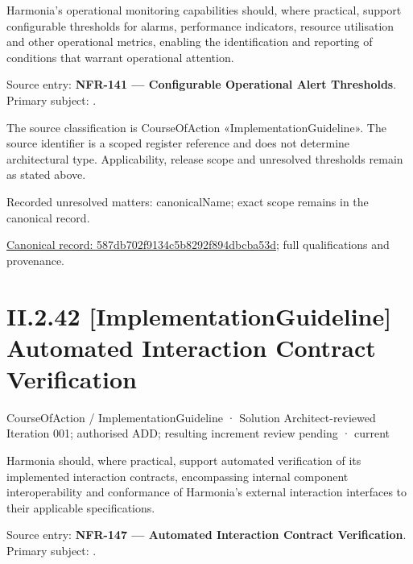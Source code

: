 Harmonia's operational monitoring capabilities should, where practical, support configurable thresholds for alarms, performance indicators, resource utilisation and other operational metrics, enabling the identification and reporting of conditions that warrant operational attention.



Source entry: \textbf{NFR-141 — Configurable Operational Alert Thresholds}. Primary subject: \texttt{}.



The source classification is CourseOfAction «ImplementationGuideline». The source identifier is a scoped register reference and does not determine architectural type. Applicability, release scope and unresolved thresholds remain as stated above.


{\small Recorded unresolved matters: canonicalName; exact scope remains in the canonical record.}\par
{\footnotesize \href{../../../../../../../continuum/strategy/course-of-action/implementation-guideline/587db702f9134c5b8292f894dbcba53d.md}{Canonical record: 587db702f9134c5b8292f894dbcba53d}; full qualifications and provenance.}\par
\section*{II.2.42 [ImplementationGuideline] Automated Interaction Contract Verification}
\label{navigation:II.2.42}

\label{element:a6c8cc8f5647461cb210f88ced90cc57}
{\small CourseOfAction / ImplementationGuideline · Solution Architect-reviewed Iteration 001; authorised ADD; resulting increment review pending · current}\par

Harmonia should, where practical, support automated verification of its implemented interaction contracts, encompassing internal component interoperability and conformance of Harmonia's external interaction interfaces to their applicable specifications.



Source entry: \textbf{NFR-147 — Automated Interaction Contract Verification}. Primary subject: \texttt{}.



